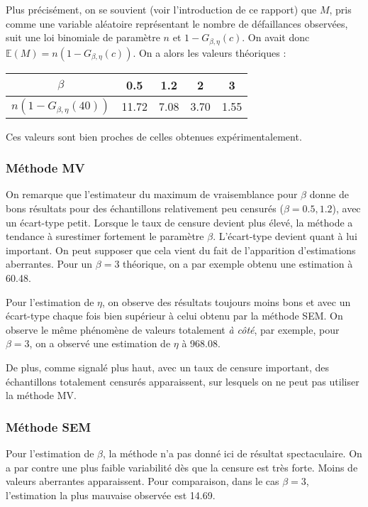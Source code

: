 \documentclass[a4paper]{report}
\begin{document}
Plus précisément, on se souvient (voir l'introduction de ce rapport) que $M$, pris comme une variable aléatoire représentant le nombre de défaillances observées, suit une loi binomiale de paramètre $n$ et $1-G_{\beta,\eta}(c)$. On avait donc   $\mathbb{E}(M)=n(1-G_{\beta,\eta}(c))$. On a alors les valeurs théoriques : 

\begin{center}
\begin{tabular}{|c|c|c|c|c|}
\hline
\bf $\beta$ & 0.5 & 1.2 & 2 & 3 \\
\hline
\bf $n (1- G_{\beta,\eta}(40))$ &11.72 & 7.08 & 3.70 & 1.55\\
\hline 
 \end{tabular}
 \end{center}
 
 Ces valeurs sont bien proches de celles obtenues expérimentalement.
  
\subsubsection*{Méthode MV}

On remarque que l'estimateur du maximum de vraisemblance pour $\beta$ donne de bons résultats pour des échantillons relativement peu censurés ($\beta=0.5,1.2$), avec un écart-type petit. Lorsque le taux de censure devient plus élevé, la méthode a tendance à surestimer fortement le paramètre $\beta$. L'écart-type devient quant à lui important. On peut supposer que cela vient du fait de l'apparition d'estimations aberrantes. Pour un  $\beta=3$ théorique, on a par exemple obtenu une estimation à 60.48. 

Pour l'estimation de $\eta$, on observe des résultats toujours moins bons et avec un écart-type chaque fois bien supérieur à celui obtenu par la méthode SEM. On observe le même phénomène de valeurs totalement \emph{à côté}, par exemple, pour $\beta=3$, on a observé une estimation de $\eta$ à 968.08.

De plus, comme signalé plus haut, avec un taux de censure important, des échantillons totalement censurés apparaissent, sur lesquels on ne peut pas utiliser la méthode MV.

\subsubsection*{Méthode SEM}

Pour l'estimation de $\beta$, la méthode n'a pas donné ici de résultat spectaculaire. On a par contre une plus faible variabilité dès que la censure est très forte. Moins de valeurs aberrantes apparaissent. Pour comparaison, dans le cas $\beta=3$, l'estimation la plus mauvaise observée est 14.69.  
\end{document}
